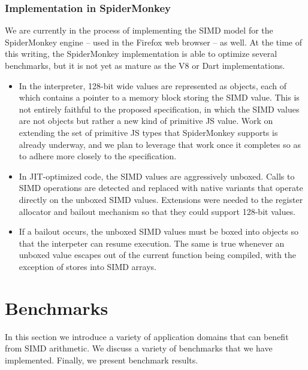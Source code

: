 \documentclass[preprint]{sigplanconf}
\begin{document}
\subsubsection{Implementation in SpiderMonkey}

We are currently in the process of implementing the SIMD model for the
SpiderMonkey engine -- used in the Firefox web browser -- as well. At
the time of this writing, the SpiderMonkey implementation is able to
optimize several benchmarks, but it is not yet as mature as the V8 or
Dart implementations.

\begin{itemize}
\item
In the interpreter, 128-bit wide values are represented as objects,
each of which contains a pointer to a memory block storing the SIMD
value. This is not entirely faithful to the proposed specification, in
which the SIMD values are not objects but rather a new kind of
primitive JS value. Work on extending the set of primitive JS types
that SpiderMonkey supports is already underway, and we plan to
leverage that work once it completes so as to adhere more closely to
the specification.

\item
In JIT-optimized code, the SIMD values are aggressively unboxed. Calls
to SIMD operations are detected and replaced with native variants that
operate directly on the unboxed SIMD values. Extensions were needed to
the register allocator and bailout mechanism so that they could
support 128-bit values.

\item
If a bailout occurs, the unboxed SIMD values must be boxed into
objects so that the interpeter can resume execution. The same is true
whenever an unboxed value escapes out of the current function being
compiled, with the exception of stores into SIMD arrays.

\end{itemize}

\section{Benchmarks}
\label{sec:benchmarks}
In this section we introduce a variety of application domains that can benefit
from SIMD arithmetic. We discuss a variety of benchmarks that we have
implemented. Finally, we present benchmark results.
\end{document}

